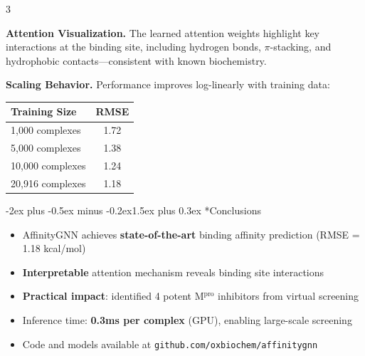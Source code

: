 \documentclass[a0paper,portrait]{article}
\makeatletter
\renewcommand{\section}{\@startsection{section}{1}{0pt}%
  {-2ex plus -0.5ex minus -0.2ex}{1.5ex plus 0.3ex}%
  {\fontsize{40}{48}\selectfont\bfseries\color{sectioncolor}}}
\newcommand{\posterbody}{\fontsize{28}{38}\selectfont}
\newcommand{\postertable}{\fontsize{26}{34}\selectfont}
\makeatother
\begin{document}
\begin{multicols}{3}
\vspace{2cm}

\textbf{Attention Visualization.} The learned attention weights highlight key interactions at the binding site, including hydrogen bonds, $\pi$-stacking, and hydrophobic contacts---consistent with known biochemistry.

\vspace{2cm}

\textbf{Scaling Behavior.} Performance improves log-linearly with training data:

\vspace{1cm}

\begin{center}
\renewcommand{\arraystretch}{1.6}
{\postertable
\begin{tabular}{@{}lc@{}}
\toprule
\textbf{Training Size} & \textbf{RMSE} \\
\midrule
1,000 complexes   & 1.72 \\
5,000 complexes   & 1.38 \\
10,000 complexes  & 1.24 \\
20,916 complexes  & 1.18 \\
\bottomrule
\end{tabular}}
\end{center}

\vspace{2cm}

\section*{Conclusions}

\posterbody

\begin{itemize}[leftmargin=1.5em, itemsep=12pt]
  \item AffinityGNN achieves \textbf{state-of-the-art} binding affinity prediction (RMSE = 1.18 kcal/mol)
  \item \textbf{Interpretable} attention mechanism reveals binding site interactions
  \item \textbf{Practical impact}: identified 4 potent M$^{\text{pro}}$ inhibitors from virtual screening
  \item Inference time: \textbf{0.3ms per complex} (GPU), enabling large-scale screening
  \item Code and models available at \texttt{github.com/oxbiochem/affinitygnn}
\end{itemize}


\end{multicols}
\end{document}
